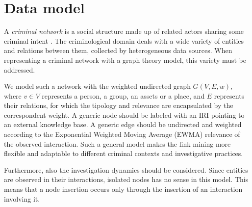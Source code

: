 \section{Data model}
\label{sec:data-model}

A \textit{criminal network} is a social structure made up of related actors sharing some criminal intent \cite{von2001organisierte}. The criminological domain deals with a wide variety of entities and relations between them, collected by heterogeneous data sources. When representing a criminal network with a graph theory model, this variety must be addressed.

We model such a network with the weighted undirected graph $G(V,E,w)$, where $v\in V$ represents a person, a group, an assets or a place, and $E$ represents their relations, for which the tipology and relevance are encapsulated by the correspondent weight.
A generic node should be labeled with an IRI pointing to an external knowledge base.
A generic edge should be undirected and weighted according to the Exponential Weighted Moving Average (EWMA) relevance of the observed interaction.  Such a general model makes the link mining more flexible and adaptable to different criminal contexts and investigative practices.

Furthermore, also the investigation dynamics should be considered. Since entities are observed in their interactions, isolated nodes has no sense in this model. This means that a node insertion occurs only through the insertion of an interaction involving it.

